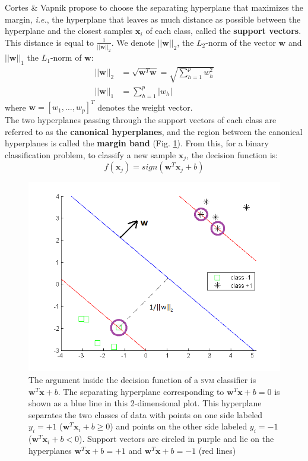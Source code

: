 \noindent Cortes \& Vapnik \cite{Cortes1995} propose to choose the separating hyperplane that maximizes the margin, \textit{i.e.}, the hyperplane that leaves as much distance as possible between the hyperplane and the closest samples $\textbf{x}_i$ of each class, called the \textbf{support vectors}. This distance is equal to $\frac{1}{||\textbf{w}||_2}$. We denote $||\textbf{w}||_2$, the $L_2$-norm of the vector $\textbf{w}$ and $||\textbf{w}||_1$ the $L_1$-norm of $\textbf{w}$:
\begin{align}
	||\textbf{w}||_2 & = \sqrt{\textbf{w}^T \textbf{w}} = \sqrt{\sum\limits_{h=1}^{p} w_h^2}\\
	||\textbf{w}||_1 & = \sum\limits_{h=1}^{p} |w_h|
\end{align}
\noindent where $\textbf{w} = [w_1, \ldots, w_p]^T$ denotes the weight vector. \\
The two hyperplanes passing through the support vectors of each class are referred to as the \textbf{canonical hyperplanes}, and the region between the canonical hyperplanes is called the \textbf{margin band} (Fig. \ref{fig:Separatrice_lineaire_avec_marges}). From this, for a binary classification problem, to classify a new sample $\textbf{x}_j$, the decision function is:
\begin{equation}
f(\textbf{x}_j) = sign(\textbf{w}^T \textbf{x}_j + b) \label{eq:decision_function}
\end{equation}

\begin{figure}
\centering
\includegraphics[width=0.55\linewidth]{images/Separatrice_lineaire_avec_marges2}
\caption[\textsc{svm} optimal hyperplane]{The argument inside the decision function of a \textsc{svm} classifier is $\textbf{w}^T\textbf{x} + b$. The separating hyperplane corresponding to $\textbf{w}^T\textbf{x} + b = 0$ is shown as a blue line in this 2-dimensional plot. This hyperplane separates the two classes of data with points on one side labeled $y_i = +1$ ($\textbf{w}^T\textbf{x}_i + b \geq 0$) and points on the other side labeled $y_i=-1$ ($\textbf{w}^T\textbf{x}_i + b < 0$). Support vectors are circled in purple and lie on the hyperplanes $\textbf{w}^T\textbf{x} + b = +1$ and $\textbf{w}^T\textbf{x} + b = -1$ (red lines)}
\label{fig:Separatrice_lineaire_avec_marges}
\end{figure}

